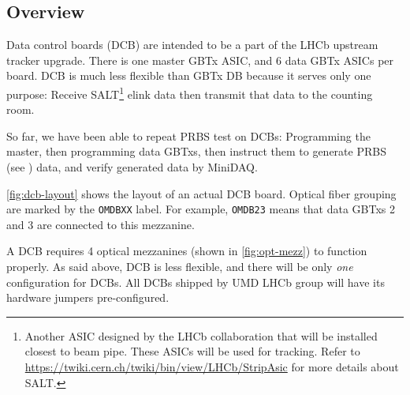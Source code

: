 \subsection{Overview}
Data control boards (DCB) are intended to be a part of the LHCb upstream tracker
upgrade.
There is one master GBTx ASIC, and 6 data GBTx ASICs per board.
DCB is much less flexible than GBTx DB because it serves only one purpose:
Receive SALT\footnote{
    Another ASIC designed by the LHCb collaboration that will be installed
    closest to beam pipe. These ASICs will be used for tracking. Refer to
    \url{https://twiki.cern.ch/twiki/bin/view/LHCb/StripAsic}
    for more details about SALT.
} elink data then transmit that data to the counting room.

So far, we have been able to repeat PRBS test on DCBs:
Programming the master, then programming data GBTxs, then instruct them to
generate PRBS (see ) data, and verify generated data by
MiniDAQ.

\autoref{fig:dcb-layout} shows the layout of an actual DCB board.
Optical fiber grouping are marked by the \texttt{OMDBXX} label. For example,
\texttt{OMDB23} means that data GBTxs 2 and 3 are connected to this mezzanine.

A DCB requires 4 optical mezzanines (shown in \autoref{fig:opt-mezz}) to
function properly.
As said above, DCB is less flexible, and there will be only \emph{one}
configuration for DCBs.
All DCBs shipped by UMD LHCb group will have its hardware jumpers
pre-configured.

